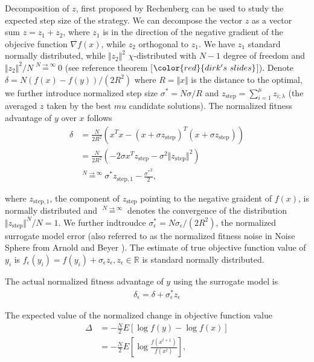 Decomposition of $z$, first proposed by Rechenberg \cite{rechenberg1973evolutionsstrategie} can be used to study the expected step size of the strategy. We can decompose the vector $z$ as a vector sum $z = z_1 + z_2$, where $z_1$ is in the direction of the negative gradient of the objecive function $\nabla f(x)$, while $z_2$ orthogonal to $z_1$. We have $z_1$ standard normally distributed, while $\Vert z_2\Vert^2$ $\chi$-distributed with $N-1$ degree of freedom and $ \Vert z_2\Vert^2 /N \overset{N \rightarrow \infty }{=} 0$ (see reference theorem [$\color{red}{dirk's\ slides }$]). Denote $\delta = N (f(x) - f(y))/(2R^2)$ where $R = \Vert x \Vert$ is the distance to the optimal, we further introduce normalized step size $\sigma^* = N \sigma/R$ and $z_{\text{step}} = \sum_{i=1}^\mu z_{i;\lambda}$ (the averaged $z$ taken by the best $mu$ candidate solutions). The normalized fitness advantage of $y$ over $x$ follows
\begin{align}
\delta & = \frac{N}{2R^2} (x^Tx - (x+\sigma z_{\text{step}})^T (x+\sigma z_{\text{step}})) \nonumber\\
& = \frac{N}{2R^2} (-2 \sigma x^Tz_{\text{step}} - \sigma^2 \Vert z_{\text{step}}\Vert^2 ) \nonumber\\
& \overset{N \rightarrow \infty}{=} \sigma^* z_{\text{step},1} - \frac{{\sigma^*} ^2}{2},
\end{align}

where $z_{\text{step},1} $, the component of $z_{\text{step}}$ pointing to the negative graident of $f(x)$, is normally distributed and $\overset{ N \rightarrow \infty}{=}$ denotes the convergence of the distribution $\Vert z_{\text{step} } \Vert^N/N = 1$. We further indtroudce $\sigma_\epsilon^* = N \sigma_\epsilon / (2R^2)$, the normalized surrogate model error (also referred to as the normalized fitness noise in Noise Sphere from Arnold and Beyer \cite{1284729}). The estimate of true objective function value of $y_i$ is $f_\epsilon (y_i) = f(y_i) + \sigma_\epsilon z_\epsilon, z_\epsilon \in \mathbb{R}$ is standard normally distributed.

The actual normalized fitness advantage of $y$ using the surrogate model is 
\begin{align}
\delta_\epsilon = \delta+\sigma_\epsilon^* z_\epsilon 
\end{align}

The expected value of the normalized change in objective function value  
\begin{align}
\Delta &= -\frac{N}{2} E \left [  \log f(y) - \log {f(x)} \right ] \nonumber\\
 &= -\frac{N}{2} E \left [  \log \frac{f(x^{t+1})}{f(x^{t})} \right ], 
\end{align}


